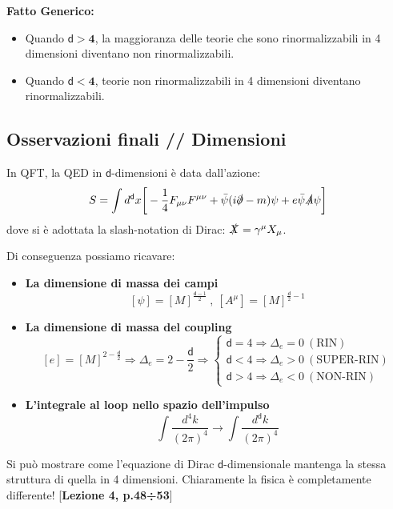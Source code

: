 \documentclass[../main.tex]{subfiles}
\begin{document}
\begin{kaobox}
    \textbf{Fatto Generico:}
    \begin{itemize}
        \item Quando $\mathbf{\mathsf{d}>4}$, la maggioranza delle teorie che sono rinormalizzabili in 4 dimensioni diventano non rinormalizzabili.
        \item Quando $\mathbf{\mathsf{d}<4}$, teorie non rinormalizzabili in 4 dimensioni diventano rinormalizzabili.
    \end{itemize}
\end{kaobox}

\subsection{Osservazioni finali // Dimensioni}
In QFT, la QED in $\mathsf{d}$-dimensioni è data dall'azione:
\[
S = \int d^\mathsf{d}x \bigg[-\frac{1}{4}F_{\mu\nu}F^{\mu\nu} + \bar\psi(i\slashed\partial - m)\psi + e\bar\psi\slashed A\psi \bigg]
\]
dove si è adottata la slash-notation di Dirac: $\slashed X = \gamma^\mu X_\mu$.

Di conseguenza possiamo ricavare:
\begin{itemize}
    \item \textbf{La dimensione di massa dei campi}
        \[
        [\psi] = [M]^{\frac{\mathsf{d}-1}{2}} ~,~ [A^\mu] = [M]^{\frac{\mathsf{d}}{2}-1}
        \]

    \item \textbf{La dimensione di massa del coupling}
        \[
        [e] = [M]^{2 - \frac{\mathsf{d}}{2}} \Rightarrow \boxed{\Delta_e = 2 - \frac{\mathsf{d}}{2}}
        \Rightarrow \begin{cases}
                    \mathsf{d} = 4 \Rightarrow \Delta_e = 0 ~(\text{RIN})\\
                    \mathsf{d} < 4 \Rightarrow \Delta_e > 0 ~(\text{SUPER-RIN})\\
                    \mathsf{d} > 4 \Rightarrow \Delta_e < 0 ~(\text{NON-RIN})
            \end{cases}
        \]
    \item \textbf{L'integrale al loop nello spazio dell'impulso}
        \[
        \int \frac{d^4k}{(2\pi)^4} \rightarrow \int \frac{d^\mathsf{d}k}{(2\pi)^4}
        \]
\end{itemize}

    \begin{nota}
        Si può mostrare come l'equazione di Dirac $\mathsf{d}$-dimensionale mantenga la stessa struttura di quella in 4 dimensioni. Chiaramente la fisica è completamente differente! [\textbf{Lezione 4, p.48÷53}]
    \end{nota}
\end{document}

